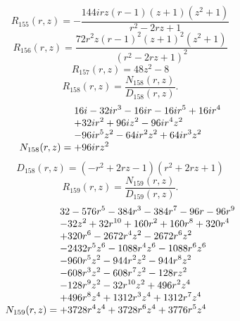 \documentclass[11pt,a4paper]{article}
\begin{document}
\begin{equation}
R_{155}(r,z)=- \frac{144 i r z \left(r - 1\right) \left(z + 1\right) \left(z^{2} + 1\right)}{r^{2} - 2 r z + 1}
\label{eq:cat-rational-155}
\end{equation}
\begin{equation}
R_{156}(r,z)=\frac{72 r^{2} z \left(r - 1\right)^{2} \left(z + 1\right)^{2} \left(z^{2} + 1\right)}{\left(r^{2} - 2 r z + 1\right)^{2}}
\label{eq:cat-rational-156}
\end{equation}
\begin{equation}
R_{157}(r,z)=48 z^{2} - 8
\label{eq:cat-rational-157}
\end{equation}
\begin{equation}
R_{158}(r,z)=\frac{N_{158}(r,z)}{D_{158}(r,z)}.
\label{eq:cat-rational-158}
\end{equation}
\begin{equation}
N_{158}(r,z)=\shortstack[l]{$\displaystyle 16 i - 32 i r^{3} - 16 i r - 16 i r^{5} + 16 i r^{4}$\\
$\displaystyle  + 32 i r^{2} + 96 i z^{2} - 96 i r^{4} z^{2}$\\
$\displaystyle  - 96 i r^{5} z^{2} - 64 i r^{2} z^{2} + 64 i r^{3} z^{2}$\\
$\displaystyle  + 96 i r z^{2}$}
\label{eq:cat-numerator-158}
\end{equation}
\begin{equation}
D_{158}(r,z)=\left(- r^{2} + 2 r z - 1\right) \left(r^{2} + 2 r z + 1\right)
\label{eq:cat-denominator-158}
\end{equation}
\begin{equation}
R_{159}(r,z)=\frac{N_{159}(r,z)}{D_{159}(r,z)}.
\label{eq:cat-rational-159}
\end{equation}
\begin{equation}
N_{159}(r,z)=\shortstack[l]{$\displaystyle 32 - 576 r^{5} - 384 r^{3} - 384 r^{7} - 96 r - 96 r^{9}$\\
$\displaystyle  - 32 z^{2} + 32 r^{10} + 160 r^{2} + 160 r^{8} + 320 r^{4}$\\
$\displaystyle  + 320 r^{6} - 2672 r^{4} z^{2} - 2672 r^{6} z^{2}$\\
$\displaystyle  - 2432 r^{5} z^{6} - 1088 r^{4} z^{6} - 1088 r^{6} z^{6}$\\
$\displaystyle  - 960 r^{5} z^{2} - 944 r^{2} z^{2} - 944 r^{8} z^{2}$\\
$\displaystyle  - 608 r^{3} z^{2} - 608 r^{7} z^{2} - 128 r z^{2}$\\
$\displaystyle  - 128 r^{9} z^{2} - 32 r^{10} z^{2} + 496 r^{2} z^{4}$\\
$\displaystyle  + 496 r^{8} z^{4} + 1312 r^{3} z^{4} + 1312 r^{7} z^{4}$\\
$\displaystyle  + 3728 r^{4} z^{4} + 3728 r^{6} z^{4} + 3776 r^{5} z^{4}$}
\label{eq:cat-numerator-159}
\end{equation}
\end{document}
